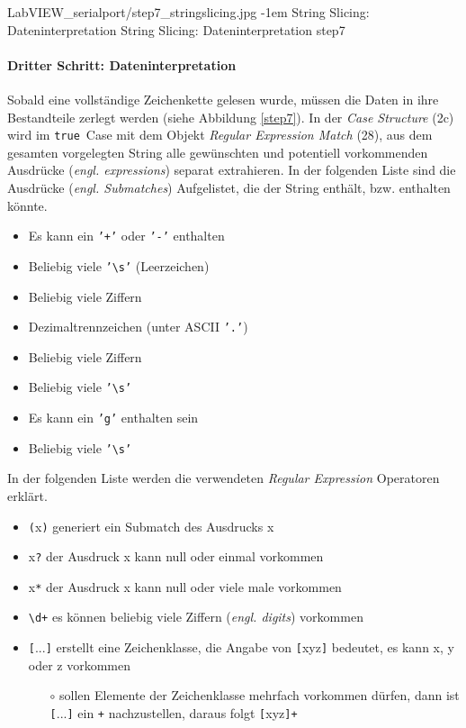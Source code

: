 {LabVIEW_serialport/step7_stringslicing.jpg}
{-1em}
{\glqq String Slicing\grqq{}: Dateninterpretation}
{\glqq String Slicing\grqq{}: Dateninterpretation}
{step7}

\paragraph{Dritter Schritt: \glqq Dateninterpretation\grqq{}} Sobald eine vollständige Zeichenkette gelesen wurde, müssen die Daten in ihre Bestandteile zerlegt werden (siehe Abbildung \ref{step7}). In der \textit{Case Structure} (2c) wird im \texttt{true}\, Case mit dem Objekt \textit{Regular Expression Match} (28), aus dem gesamten vorgelegten String alle gewünschten und potentiell vorkommenden Ausdrücke (\textit{engl. expressions}) separat extrahieren. In der folgenden Liste sind die Ausdrücke (\textit{engl. Submatches}) Aufgelistet, die der String enthält, bzw. enthalten könnte.

\begin{itemize} %
\singlespacing
\item Es kann ein \texttt{'+'} oder \texttt{'-'} enthalten
\item Beliebig viele \texttt{'\textbackslash s'} (Leerzeichen)
\item Beliebig viele Ziffern
\item Dezimaltrennzeichen (unter ASCII \texttt{'.'})
\item Beliebig viele Ziffern
\item Beliebig viele \texttt{'\textbackslash s'}
\item Es kann ein \texttt{'g'} enthalten sein
\item Beliebig viele \texttt{'\textbackslash s'}
\end{itemize}


 In der folgenden Liste werden die verwendeten \textit{Regular Expression} Operatoren erklärt.

\begin{itemize} %
\singlespacing
\item \texttt{(}x\texttt{)} generiert ein Submatch des Ausdrucks x
\item x\texttt{?} der Ausdruck x kann null oder einmal vorkommen
\item x\texttt{*} der Ausdruck x kann null oder viele male vorkommen
\item \texttt{\textbackslash d+} es können beliebig viele Ziffern (\textit{engl. digits}) vorkommen
\item \texttt{[}...\texttt{]} erstellt eine Zeichenklasse, die Angabe von \texttt{[}xyz\texttt{]} bedeutet, es kann x, y oder z vorkommen
	\begin{itemize} 
		\item[\small $\circ$] sollen Elemente der Zeichenklasse mehrfach vorkommen dürfen, dann ist \texttt{[}...\texttt{]} ein \texttt{+} nachzustellen, daraus folgt \texttt{[}xyz\texttt{]+} 
\end{itemize}
\end{itemize}

